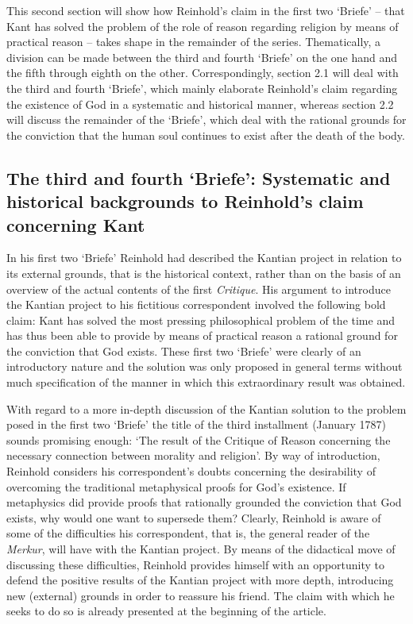  This second section will show how Reinhold's claim in the first two `Briefe' {--} that Kant has solved the problem of the role of reason regarding religion by means of practical reason {--} takes shape in the remainder of the series. Thematically, a division can be made between the third and fourth `Briefe' on the one hand and the fifth through eighth on the other. Correspondingly, section 2.1 will deal with the third and fourth `Briefe', which mainly elaborate Reinhold's claim regarding the existence of God in a systematic and historical manner, whereas section 2.2 will discuss the remainder of the `Briefe', which deal with the rational grounds for the conviction that the human soul continues to exist after the death of the body. 


\subsection{The third and fourth `Briefe': Systematic and historical backgrounds to Reinhold's claim concerning Kant}


In his first two `Briefe' Reinhold had described the Kantian project in relation to its external grounds, that is the historical context, rather than on the basis of an overview of the actual contents of the first \textit{Critique}. His argument to introduce the Kantian project to his fictitious correspondent involved the following bold claim: Kant has solved the most pressing philosophical problem of the time and has thus been able to provide by means of practical reason a rational ground for the conviction that God exists. These first two `Briefe' were clearly of an introductory nature and the solution was only proposed in general terms without much specification of the manner in which this extraordinary result was obtained. 

 With regard to a more in{-}depth discussion of the Kantian solution to the problem posed in the first two `Briefe' the title of the third installment (January 1787) sounds promising enough: `The result of the Critique of Reason concerning the necessary connection between morality and religion'. By way of introduction, Reinhold considers his correspondent's doubts concerning the desirability of overcoming the traditional metaphysical proofs for God's existence. If metaphysics did provide proofs that rationally grounded the conviction that God exists, why would one want to supersede them? Clearly, Reinhold is aware of some of the difficulties his correspondent, that is, the general reader of the \textit{Merkur}, will have with the Kantian project. By means of the didactical move of discussing these difficulties, Reinhold provides himself with an opportunity to defend the positive results of the Kantian project with more depth, introducing new (external) grounds in order to reassure his friend. The claim with which he seeks to do so is already presented at the beginning of the article. 

